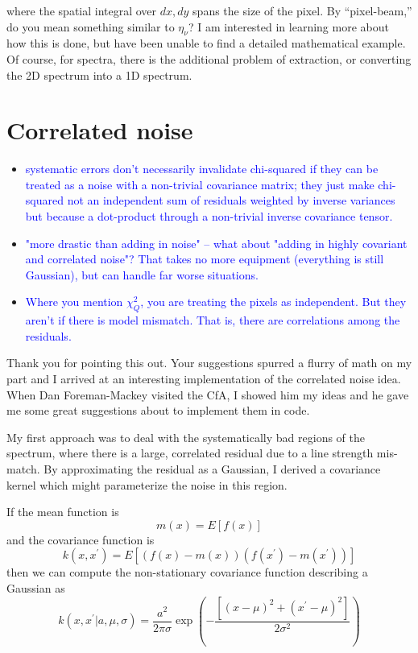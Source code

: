\documentclass[preprint]{aastex} %
\newcommand{\hcom}[1]{ \textcolor{Blue}{#1}}
\begin{document}
where the spatial integral over $dx, dy$ spans the size of the pixel. By ``pixel-beam,'' do you mean something similar to $\eta_\nu$? I am interested in learning more about how this is done, but have been unable to find a detailed mathematical example. Of course, for spectra, there is the additional problem of extraction, or converting the 2D spectrum into a 1D spectrum.


\section{Correlated noise}
\begin{itemize}
  \item \hcom{systematic errors don't necessarily invalidate chi-squared if they can be treated as a noise with a non-trivial covariance matrix; they just make chi-squared not an independent sum of residuals weighted by inverse variances but because a dot-product through a non-trivial inverse covariance tensor.}
  \item \hcom{"more drastic than adding in noise" -- what about "adding in highly covariant and correlated noise"? That takes no more equipment (everything is still Gaussian), but can handle far worse situations.}
  \item \hcom{Where you mention $\chi^2_Q$, you are treating the pixels as independent. But they aren't if there is model mismatch. That is, there are correlations among the residuals.}
\end{itemize}

Thank you for pointing this out. Your suggestions spurred a flurry of math on my part and I arrived at an interesting implementation of the correlated noise idea. When Dan Foreman-Mackey visited the CfA, I showed him my ideas and he gave me some great suggestions about to implement them in code.  

My first approach was to deal with the systematically bad regions of the spectrum, where there is a large, correlated residual due to a line strength mis-match. By approximating the residual as a Gaussian, I derived a covariance kernel which might parameterize the noise in this region.

If the mean function is
\begin{equation}
m(x) = E[f(x)]
\end{equation}
and the covariance function is
\begin{equation}
k(x, x^\prime) = E[(f(x) - m(x))(f(x^\prime) - m(x^\prime))]
\end{equation}
then we can compute the non-stationary covariance function describing a Gaussian as
\begin{equation}
k(x, x^\prime | a, \mu, \sigma) = \frac{a^2}{2 \pi \sigma} \exp \left ( - \frac{[(x - \mu)^2 + (x^\prime - \mu)^2]}{2 \sigma^2}\right )
\end{equation}
\end{document}
